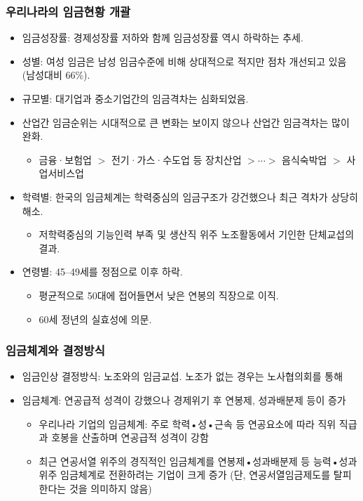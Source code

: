 \documentclass[aspectratio=169,xcolor=dvipsnames,handout]{beamer}
\begin{document}
\begin{frame}[allowframebreaks]
    \frametitle{우리나라의 임금현황 개괄}
    \begin{itemize}[<+->]
        \item 임금성장률: 경제성장률 저하와 함께 임금성장률 역시 하락하는 추세.
        \item 성별: 여성 임금은 남성 임금수준에 비해 상대적으로 적지만 점차 개선되고 있음 (남성대비 66\%).
        \item 규모별: 대기업과 중소기업간의 임금격차는 심화되었음.
        \item 산업간 임금순위는 시대적으로 큰 변화는 보이지 않으나 산업간 임금격차는 많이 완화.
        \begin{itemize}[<+->]
            \item 금융·보험업 $>$ 전기·가스·수도업 등 장치산업 $> \cdots >$ 음식숙박업 $>$ 사업서비스업
        \end{itemize}
    \framebreak%
        \item 학력별: 한국의 임금체계는 학력중심의 임금구조가 강건했으나 최근 격차가 상당히 해소.
        \begin{itemize}[<+->]
            \item 저학력중심의 기능인력 부족 및 생산직 위주 노조활동에서 기인한 단체교섭의 결과.
        \end{itemize}
        \item 연령별: 45--49세를 정점으로 이후 하락.
        \begin{itemize}[<+->]
            \item 평균적으로 50대에 접어들면서 낮은 연봉의 직장으로 이직.
            \item 60세 정년의 실효성에 의문.
        \end{itemize}
    \end{itemize}
\end{frame}


\begin{frame}[allowframebreaks]
    \frametitle{임금체계와 결정방식}
    \begin{itemize}[<+->]
        \item 임금인상 결정방식: 노조와의 임금교섭. 노조가 없는 경우는 노사협의회를 통해
        \item 임금체계: 연공급적 성격이 강했으나 경제위기 후 연봉제, 성과배분제 등이 증가
        \begin{itemize}[<+->]
            \item 우리나라 기업의 임금체계: 주로 학력•성•근속 등 연공요소에 따라 직위 직급과 호봉을 산출하며 연공급적 성격이 강함
            \item 최근 연공서열 위주의 경직적인 임금체계를 연봉제•성과배분제 등 능력•성과위주 임금체계로 전환하려는 기업이 크게 증가 (단, 연공서열임금제도를 탈피한다는 것을 의미하지 않음)
        \end{itemize}
    \end{itemize}
\end{frame}
\end{document}
